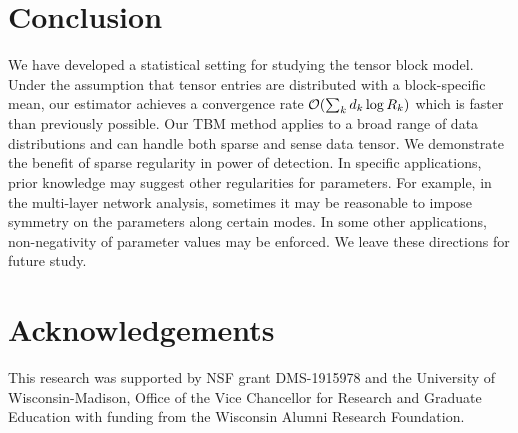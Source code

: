 \documentclass{article}
\begin{document}
\vspace{-.1cm}
\section{Conclusion}

We have developed a statistical setting for studying the tensor block model. Under the assumption that tensor entries are distributed with a block-specific mean, our estimator achieves a convergence rate $\mathcal{O}( \sum_kd_k\log R_k)$ which is faster than previously possible. Our TBM method applies to a broad range of data distributions and can handle both sparse and sense data tensor. We demonstrate the benefit of sparse regularity in power of detection. In specific applications, prior knowledge may suggest other regularities for parameters. For example, in the multi-layer network analysis, sometimes it may be reasonable to impose symmetry on the parameters along certain modes. In some other applications, non-negativity of parameter values may be enforced. We leave these directions for future study. 





\section*{Acknowledgements}
This research was supported by NSF grant DMS-1915978 and the University of Wisconsin-Madison, Office of the Vice Chancellor for Research and Graduate Education with funding from the Wisconsin Alumni Research Foundation. 


\end{document}
